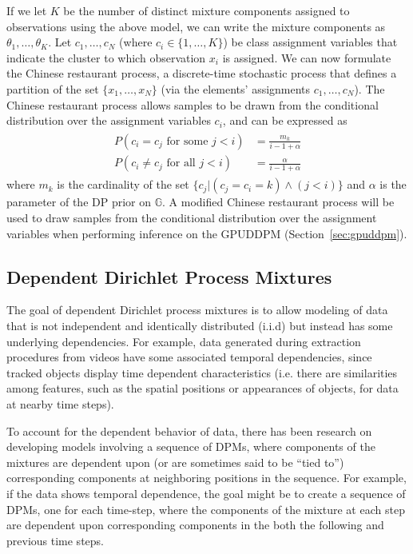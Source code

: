 \documentclass[twocolumn, final]{svjour3}
\begin{document}
If we let $K$ be the number of distinct mixture components assigned to observations using the above model, we can write the mixture components as $\theta_{1}, \ldots, \theta_{K}$. Let $c_{1}, \ldots, c_{N}$ (where $c_{i} \in \{1, \ldots, K \}$) be class assignment variables that indicate the cluster to which observation $x_{i}$ is assigned. We can now formulate the Chinese restaurant process, a discrete-time stochastic process that defines a partition of the set $\{ x_{1}, \ldots, x_{N} \}$ (via the elements' assignments $c_{1}, \ldots, c_{N}$). The Chinese restaurant process allows samples to be drawn from the conditional distribution over the assignment variables $c_{i}$, and can be expressed as
\begin{align}
\begin{split}
\label{crp_rep}
	P(c_{i} = c_{j} \text{  for some  } j<i) &= \frac{m_{k}}{i-1+\alpha}\\
	P(c_{i} \neq c_{j} \text{  for all  } j<i) &= \frac{\alpha}{i-1+\alpha}
\end{split}
\end{align}
where $m_{k}$ is the cardinality of the set $\{ c_{j} | (c_{j}=c_{i}=k)  \wedge  (j < i) \}$ and $\alpha$ is the parameter of the DP prior on $\mathbb{G}$. A modified Chinese restaurant process will be used to draw samples from the conditional distribution over the assignment variables when performing inference on the GPUDDPM (Section~\ref{sec:gpuddpm}).






\subsection{Dependent Dirichlet Process Mixtures}
\label{sec:ddpm}

The goal of dependent Dirichlet process mixtures is to allow modeling of data that is not independent and identically distributed (i.i.d) but instead has some underlying dependencies. For example, data generated during extraction procedures from videos have some associated temporal dependencies, since tracked objects display time dependent characteristics (i.e. there are similarities among features, such as the spatial positions or appearances of objects, for data at nearby time steps).

To account for the dependent behavior of data, there has been research on developing models involving a sequence of DPMs, where components of the mixtures are dependent upon (or are sometimes said to be ``tied to'') corresponding components at neighboring positions in the sequence. For example, if the data shows temporal dependence, the goal might be to create a sequence of DPMs, one for each time-step, where the components of the mixture at each step are dependent upon corresponding components in the both the following and previous time steps.
\end{document}
